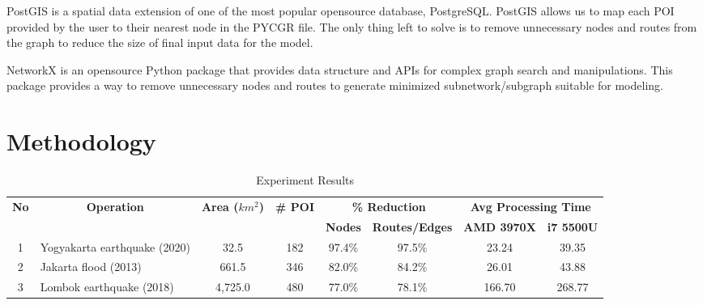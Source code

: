 \documentclass[conference]{IEEEtran}
\begin{document}
PostGIS\cite{postgis2019postgis} is a spatial data extension of one of the most popular opensource database, PostgreSQL\cite{postgresql1996postgresql}. PostGIS allows us to map each POI provided by the user to their nearest node in the PYCGR file. The only thing left to solve is to remove unnecessary nodes and routes from the graph to reduce the size of final input data for the model.

NetworkX\cite{SciPyProceedings_11} is an opensource Python package that provides data structure and APIs for complex graph search and manipulations. This package provides a way to remove unnecessary nodes and routes to generate minimized subnetwork/subgraph suitable for modeling.

\section{Methodology}

\bgroup
\def\arraystretch{1.5}
\begin{table}[htbp]
\caption{Experiment Results}
\begin{center}
\begin{tabular}{|c|l|c|c|c|c|c|c|}
\hline
\multicolumn{1}{|c|}{\multirow{2}{*}{\textbf{No}}} & 
\multicolumn{1}{c|}{\multirow{2}{*}{\textbf{Operation}}} & 
\multicolumn{1}{c|}{\multirow{2}{*}{\textbf{Area ($km^2$)}}} & 
\multicolumn{1}{c|}{\multirow{2}{*}{\textbf{\# POI}}} & 
\multicolumn{2}{c|}{\textbf{\% Reduction}} & 
\multicolumn{2}{c|}{\textbf{Avg Processing Time}} \\
\cline{5-8}
\multicolumn{1}{|c|}{} & 
\multicolumn{1}{c|}{} & 
\multicolumn{1}{c|}{} & 
\multicolumn{1}{c|}{} & 
\multicolumn{1}{c|}{\textbf{Nodes}} & 
\multicolumn{1}{c|}{\textbf{Routes/Edges}} & 
\multicolumn{1}{c|}{\textbf{AMD 3970X}} &
\multicolumn{1}{c|}{\textbf{i7 5500U}} \\ 
\hline
1 & Yogyakarta earthquake (2020)	& 32.5		& 182 & 	97.4\% & 97.5\% 	& 23.24 & 39.35 \\ \hline
2 & Jakarta flood (2013) 			& 661.5		& 346 & 	82.0\%	& 84.2\% 	& 26.01 & 43.88 \\ \hline
3 & Lombok earthquake (2018) 		& 4,725.0	& 480 & 	77.0\%	& 78.1\% 	& 166.70 & 268.77 \\ \hline
\end{tabular}
\label{table_experiment_results}
\end{center}
\end{table}
\egroup
\end{document}
